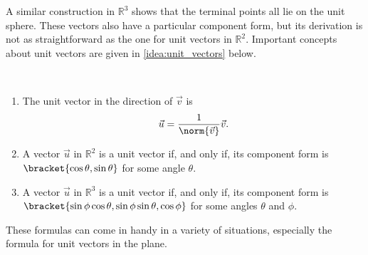 A similar construction in $\mathbb{R}^3$ shows that the terminal points all lie on the unit sphere. These vectors also have a particular component form, but its derivation is not as straightforward as the one for unit vectors in $\mathbb{R}^2$. Important concepts about unit vectors are given in \autoref{idea:unit_vectors} below.

\begin{keyidea}\label{idea:unit_vectors}
%
\mbox{}\\[-2\baselineskip]\parbox[t]{\linewidth}{\begin{enumerate}
	\item	The unit vector in the direction of $\vec v$ is
	\[\vec u = \frac1{\norm{\vec v}} \vec v.\]
	\item	A vector $\vec u$ in $\mathbb{R}^2$ is a unit vector if, and only if, its component form is $\bracket{\cos\theta,\sin\theta}$ for some angle $\theta$.
	\item	A vector $\vec u$ in $\mathbb{R}^3$ is a unit vector if, and only if, its component form is $\bracket{\sin\phi\cos\theta,\sin\phi\sin\theta,\cos\phi}$ for some angles $\theta$ and $\phi$.
\end{enumerate}}
\end{keyidea}

These formulas can come in handy in a variety of situations, especially the formula for unit vectors in the plane.


